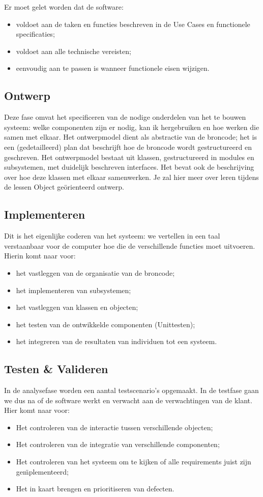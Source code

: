 Er moet gelet worden dat de software:
\begin{itemize}
	\item voldoet aan de taken en functies beschreven in de Use Cases en functionele specificaties;
	\item voldoet aan alle technische vereisten; 
	\item eenvoudig aan te passen is wanneer functionele eisen wijzigen.
\end{itemize}

\subsection{Ontwerp}
Deze fase omvat het specificeren van de nodige onderdelen van het te bouwen systeem: welke componenten zijn er nodig, kan ik hergebruiken en hoe werken die samen met elkaar. 
Het ontwerpmodel dient als abstractie van de broncode; het is een (gedetailleerd) plan dat beschrijft hoe de broncode wordt gestructureerd en geschreven. Het ontwerpmodel bestaat uit klassen, gestructureerd in modules en subsystemen, met duidelijk beschreven interfaces. Het bevat ook de beschrijving over hoe deze klassen met elkaar samenwerken. Je zal hier meer over leren tijdens de lessen Object ge\"orienteerd ontwerp.

\subsection{Implementeren}
Dit is het eigenlijke coderen van het systeem: we vertellen in een taal verstaanbaar voor de computer hoe die de verschillende functies moet uitvoeren.
Hierin komt naar voor:
 
 \begin{itemize}
		\item het vastleggen van de organisatie van de broncode;
		\item het implementeren van subsystemen;
		\item het vastleggen van klassen en objecten;
		\item het testen van de ontwikkelde componenten (Unittesten);
		\item het integreren van de resultaten van individuen tot een systeem.
\end{itemize}


\subsection{Testen \& Valideren}
In de analysefase worden een aantal testscenario's opgemaakt. In de testfase gaan we dus na of de software werkt en verwacht aan de verwachtingen van de klant. Hier komt naar voor:
\begin{itemize}
	\item Het controleren van de interactie tussen verschillende objecten;
	\item Het controleren van de integratie van verschillende componenten;
	\item Het controleren van het systeem om te kijken of alle requirements juist zijn ge\"mplementeerd;
	\item Het in kaart brengen en prioritiseren van defecten.
\end{itemize}

